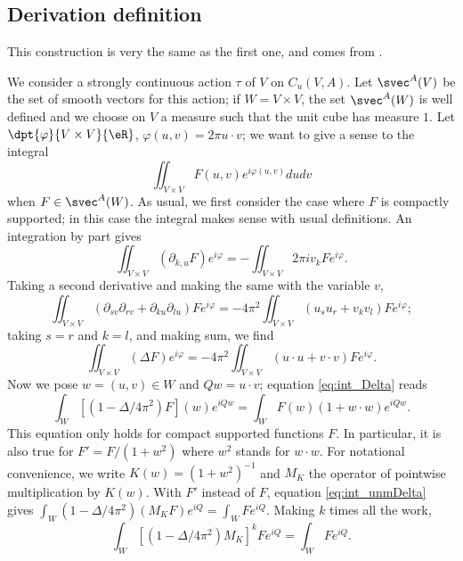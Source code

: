 \subsection{Derivation definition}

This construction is very the same as the first one, and comes from \cite{Rieffel}.

We consider a strongly continuous action $\tau$ of $V$ on $ C_u(V,A)$. Let $\svec^A(V)$ be the set of smooth vectors for this action; if $W=V\times V$, the set $\svec^A(W)$ is well defined and we choose on $V$ a measure such that the unit cube has measure $1$. Let $\dpt{\varphi}{V\times V}{\eR}$, $\varphi(u,v)=2\pi u\cdot v$; we want to give a sense to the integral
\[ 
  \iint_{V\times V}F(u,v)e^{i\varphi(u,v)}dudv
\]
when $F\in\svec^A(W)$. As usual, we first consider the case where $F$ is compactly supported; in this case the integral makes sense with usual definitions. An integration by part gives
\[ 
  \iint_{V\times V}(\partial_{k,u}F)e^{i\varphi}=-\iint_{V\times V}2\pi i v_k Fe^{i\varphi}.
\]
Taking a second derivative and making the same with the variable $v$,
\[ 
  \iint_{V\times V}(\partial_{sv}\partial_{rv}+\partial_{ku}\partial_{lu})Fe^{i\varphi}=-4\pi^2\iint_{V\times V}(u_su_r+v_kv_l)Fe^{i\varphi};
\]
taking $s=r$ and $k=l$, and making sum, we find
\begin{equation} \label{eq:int_Delta}
\iint_{V\times V}(\Delta F)e^{i\varphi}=-4\pi^2\iint_{V\times V} (u\cdot u+v\cdot v)Fe^{i\varphi}.
\end{equation}
Now we pose $w=(u,v)\in W$ and $Qw=u\cdot v$;  equation \eqref{eq:int_Delta} reads 
\begin{equation} \label{eq:int_unmDelta}
   \int_W[(1-\Delta/4\pi^2)F](w)e^{iQw}=\int_WF(w)(1+w\cdot w)e^{iQw}.
\end{equation}
This equation only holds for compact supported functions $F$. In particular, it is also true for $F'=F/(1+w^2)$ where $w^2$ stands for $w\cdot w$. For notational convenience, we write $K(w)=(1+w^2)^{-1}$ and $M_K$ the operator of pointwise multiplication by $K(w)$. With $F'$ instead of $F$, equation \eqref{eq:int_unmDelta} gives $\int_W(1- \Delta/4\pi^2)(M_KF)e^{iQ}=\int_W Fe^{iQ}$. Making $k$ times all the work,
\begin{equation}
\int_W [(1-\Delta/4\pi^2)M_K]^kFe^{iQ}=\int_WFe^{iQ}.
\end{equation}

